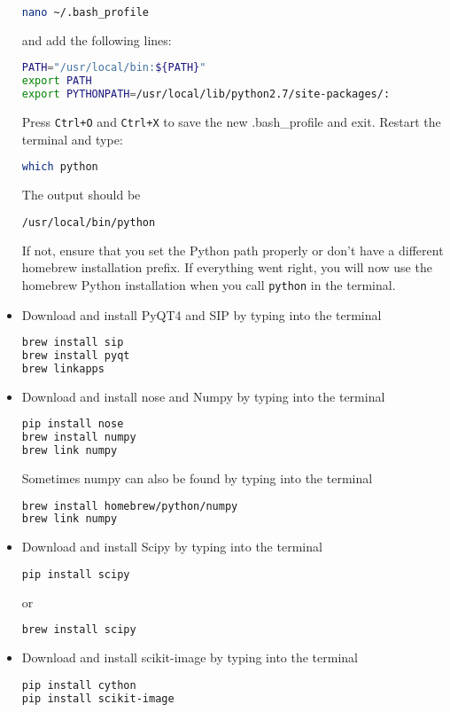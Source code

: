 \documentclass[a4paper,11pt]{article}
\begin{document}
\begin{itemize}
\begin{lstlisting}[frame=single,language=bash]
nano ~/.bash_profile
\end{lstlisting}
and add the following lines:
\begin{lstlisting}[frame=single,language=bash]  
PATH="/usr/local/bin:${PATH}"
export PATH
export PYTHONPATH=/usr/local/lib/python2.7/site-packages/:
\end{lstlisting}
Press \verb-Ctrl+O- and \verb-Ctrl+X- to save the new .bash\_profile and exit. Restart the terminal and type:
\begin{lstlisting}[frame=single,language=bash]  
which python 
\end{lstlisting}
The output should be
\begin{lstlisting}[frame=single,language=bash]  
/usr/local/bin/python
\end{lstlisting}
If not, ensure that you set the Python path properly or don't have a different homebrew installation prefix. If everything went right, you will now use the homebrew Python installation when you call \verb+python+ in the terminal.
\item Download and install PyQT4 and SIP by typing into the terminal
\begin{lstlisting}[frame=single,language=bash]  
brew install sip
brew install pyqt
brew linkapps
\end{lstlisting}
\item Download and install nose and Numpy by typing into the terminal
\begin{lstlisting}[frame=single,language=bash]  
pip install nose
brew install numpy 
brew link numpy
\end{lstlisting}
Sometimes numpy can also be found by typing into the terminal
\begin{lstlisting}[frame=single,language=bash]  
brew install homebrew/python/numpy
brew link numpy
\end{lstlisting}
\item Download and install Scipy by typing into the terminal
\begin{lstlisting}[frame=single,language=bash]  
pip install scipy
\end{lstlisting}
or 
\begin{lstlisting}[frame=single,language=bash]  
brew install scipy
\end{lstlisting}
\item Download and install scikit-image by typing into the terminal
\begin{lstlisting}[frame=single,language=bash]  
pip install cython
pip install scikit-image
\end{lstlisting}

\end{itemize}
\end{document}
